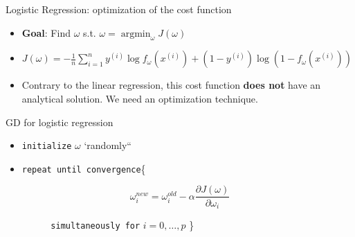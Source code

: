 \documentclass[
  9pt,
  ignorenonframetext,
  aspectratio=169,
  t, dvipsnames]{beamer}
\providecommand{\tightlist}{%
  \setlength{\itemsep}{0pt}\setlength{\parskip}{0pt}}\usepackage{longtable,booktabs,array}
\DeclareMathOperator*{\argmin}{argmin}
\theoremstyle{definition}
\begin{document}
\begin{frame}[fragile]{Logistic Regression: optimization of the cost
function}
\protect\hypertarget{logistic-regression-optimization-of-the-cost-function}{}
\begin{itemize}
\tightlist
\item
  \textbf{Goal}: Find \(\omega\) s.t.
  \(\omega=\argmin_{\omega} J(\omega)\)
\item
  \(J(\omega) = \displaystyle - \frac{1}{n} \sum_{i=1}^{n} y^{(i)} \log f_{\omega}\left(x^{(i)}\right)+\left(1-y^{(i)}\right) \log \left(1-f_{\omega}\left(x^{(i)}\right)\right)\)
\item
  Contrary to the linear regression, this cost function \textbf{does
  not} have an \alert{analytical} solution. We need an optimization
  technique.
\end{itemize}

\pause

\begin{alertblock}{GD for logistic regression}

\begin{itemize}
\tightlist
\item
  \texttt{initialize} \(\omega\) `randomly``
\item
  \texttt{repeat\ until\ convergence}\{
\end{itemize}

\[\omega_i^{new} = \omega_i^{old} - \alpha \frac{\partial J(\omega)}{\partial \omega_i} \]

\(\quad \quad \quad \quad \,\,\) \texttt{simultaneously\ for}
\(i=0,\ldots,p\) \}

\end{alertblock}
\end{frame}
\end{document}
